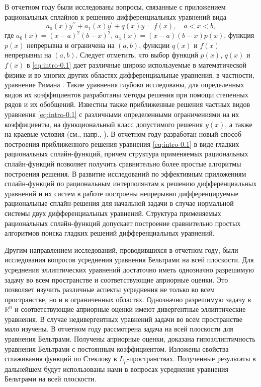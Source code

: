 В отчетном году были исследованы вопросы, связанные с приложением рациональных сплайнов к решению дифференциальных уравнений вида
\begin{equation}\label{eq:intro-0.1}
a_0(x) y^{\prime\prime}+a_1(x) y^\prime+q(x) y=f(x),\quad a< x<b,
\end{equation}
где $a_0(x)=(x-a)^2(b-x)^2$, $a_1(x)=(x-a)(b-x)p(x)$, функция $p(x)$ непрерывна и ограничена на $(a,b)$, функции $q(x)$ и $f(x)$ непрерывны на $(a,b)$.
Следует отметить, что выбор функций $p(x)$, $q(x)$ и $f(x)$ в \eqref{eq:intro-0.1} дает различные широко используемые в математической физике и во многих других областях дифференциальные уравнения, в частности, уравнение Римана \cite{bib:ark-1, bib:ark-2, bib:ark-3}. Такие уравнения глубоко
исследованы, для определенных видов их коэффициентов разработаны методы решения при помощи степенных рядов и их обобщений.
Известны также приближенные решения частных видов уравнения \eqref{eq:intro-0.1} с различными
определенными ограничениями на их коэффициенты, на функциональный класс допустимого
решения $y(x)$, а также на краевые условия (см., напр.,  \cite{bib:ark-4, bib:ark-5, bib:ark-6, bib:ark-7, bib:ark-8, bib:ark-9, bib:ark-10}).
В отчетном году разработан новый способ построения приближенного решения уравнения
\eqref{eq:intro-0.1} в виде гладких рациональных сплайн-функций, причем структура применяемых
рациональных сплайн-функций позволяет получить сравнительно более простые алгоритмы
построения решения.
В развитие исследований по эффективным приложениям сплайн-функций по рациональным
 интерполянтам к решению дифференциальных уравнений и их систем в работе \cite{bib:ark-19}
 построены непрерывно дифференцируемые рациональные сплайн-решения
 для начальной задачи в случае нормальной системы двух дифференциальных уравнений.
Структура применяемых рациональных сплайн-функций допускает построение сравнительно
простых алгоритмов поиска гладких решений дифференциальных уравнений.

Другим направлением исследований, проводившихся в отчетном году, были исследования вопросов усреднения уравнения Бельтрами на всей плоскости.
Для усреднения эллиптических уравнений достаточно иметь однозначно разрешимую задачу во всем пространстве и соответствующие априорные оценки. Это позволяет изучить различные  аспекты усреднения не только во всем пространстве, но и в ограниченных областях. Однозначно разрешимую задачу в $\mathbb{R}^n$ и соответствующие априорные оценки имеют дивергентные эллиптические уравнения. В случае недивергентных уравнений задачи во всем пространстве мало изучены.
В отчетном году рассмотрена задача на всей плоскости для уравнения Бельтрами. Получены априорные оценки, доказана гипоэллиптичность уравнения Бельтрами с постоянным коэффициентом. Изложены свойства сглаживания функций по Стеклову в $L_p$-пространствах. Полученные результаты в дальнейшем будут использованы нами в вопросах усреднения уравнения Бельтрами на всей плоскости.

